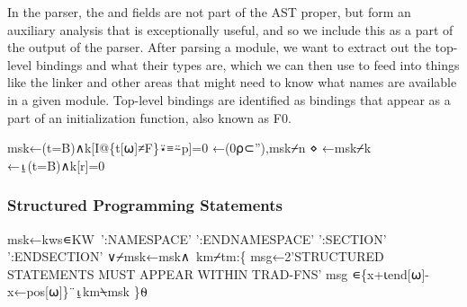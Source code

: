 \documentclass{article}%
\begin{document}
In the parser,
the {\Tt{}\nwendquote} and {\Tt{}\nwendquote} fields are not part of the AST proper, 
but form an auxiliary analysis that is exceptionally useful,
and so we include this as a part of the output of the parser.
After parsing a module, we want to extract out the top-level 
bindings and what their types are,
which we can then use to feed into things like the linker 
and other areas that might need to know what names are available
in a given module.
Top-level bindings are identified as bindings that appear as a 
part of an initialization function, also known as {\Tt{}F0\nwendquote}.

\nwenddocs{}\endmoddef\nwstartdeflinemarkup{}\nwenddeflinemarkup
msk←(t=B)∧k[I@\{t[⍵]≠F\}⍣≡⍨p]=0
←(0⍴⊂''),msk⌿n ⋄ ←msk⌿k
\eatline
{}\nwendcode{}\nwdocspar
\nwenddocs{}\endmoddef\nwstartdeflinemarkup{}\nwenddeflinemarkup
{}←⍸(t=B)∧k[r]=0
\eatline
{}\nwendcode{}\nwdocspar
\subsubsection{Structured Programming Statements}

\nwenddocs{}\endmoddef\nwstartdeflinemarkup{}\nwenddeflinemarkup
msk←kws∊KW~':NAMESPACE' ':ENDNAMESPACE' ':SECTION' ':ENDSECTION'
∨⌿msk←msk∧~km⌿tm:\{
        msg←2'STRUCTURED STATEMENTS MUST APPEAR WITHIN TRAD-FNS'
        msg  ∊\{x+⍳end[⍵]-x←pos[⍵]\}¨⍸km⍀msk
\}⍬
\nwendcode{}\nwdocspar
\end{document}
